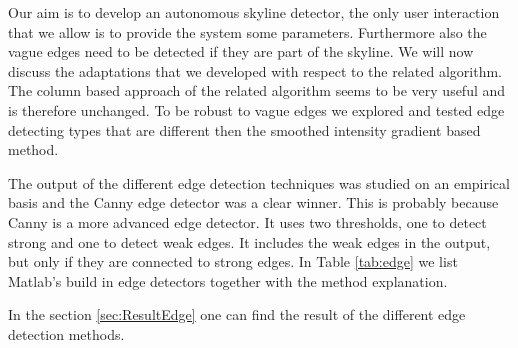 Our aim is to develop an autonomous skyline detector, the only user interaction
that we allow is to provide the system some parameters. Furthermore also the vague
edges need to be detected if they are part of the skyline. We will now discuss
the adaptations that we developed with respect to the related algorithm.\\

The column based approach of the related algorithm seems to be very useful and is
therefore unchanged.  To be robust to vague edges we explored and tested
edge detecting types that are different then the smoothed intensity gradient
based method.

The output of the different edge detection techniques was studied on an empirical
basis and the Canny edge detector \cite{Canny} was a clear winner. This is
probably because Canny is a more advanced edge detector.  It uses two
thresholds, one to detect strong and one to detect weak edges. It includes the weak edges in the
output, but only if they are connected to strong edges. In Table \ref{tab:edge} %
we list Matlab's build in edge detectors together with the method explanation.

In the section \ref{sec:ResultEdge} one can find the result of the different
edge detection methods.


